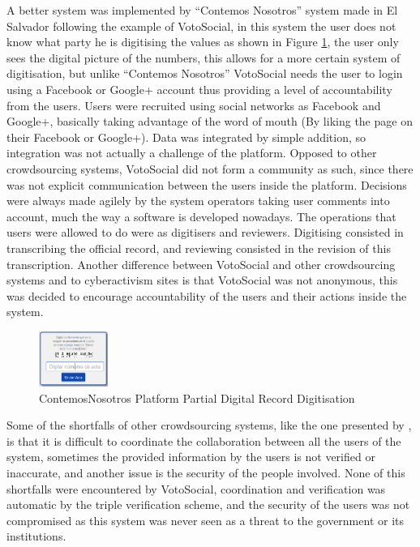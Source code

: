 \documentclass[letterpaper,10pt]{article}
\begin{document}
A better system was implemented by ``Contemos Nosotros'' \citep{contemosnosotros} system made in El Salvador following the example of VotoSocial, in this system the user does not know what party he is digitising the values as shown in Figure \ref{fig:salvador}, the user only sees the digital picture of the numbers, this allows for a more certain system of digitisation, but unlike ``Contemos Nosotros'' VotoSocial needs the user to login using a Facebook or Google+ account thus providing a level of accountability from the users. Users were recruited using social networks as Facebook and Google+, basically taking advantage of the word of mouth (By liking the page on their Facebook or Google+). Data was integrated by simple addition, so integration was not actually a challenge of the platform. Opposed to other crowdsourcing systems, VotoSocial did not form a community as such, since there was not explicit communication between the users inside the platform. Decisions were always made agilely by the system operators taking user comments into account, much the way a software is developed nowadays. The operations that users were allowed to do were as digitisers and reviewers. Digitising consisted in transcribing the official record, and reviewing consisted in the revision of this transcription. Another difference between VotoSocial and other crowdsourcing systems and to cyberactivism sites is that VotoSocial was not anonymous, this was decided to encourage accountability of the users and their actions inside the system. 

\begin{figure}[h!]
    \centering
    \includegraphics[width=0.2\textwidth]{images/salvador}
    \caption{ContemosNosotros Platform Partial Digital Record Digitisation}
    \label{fig:salvador}
\end{figure}


Some of the shortfalls of other crowdsourcing systems, like the one presented by \cite{gao2011}, is that it is difficult to coordinate the collaboration between all the users of the system, sometimes the provided information by the users is not verified or inaccurate, and another issue is the security of the people involved. None of this shortfalls were encountered by VotoSocial, coordination and verification was automatic by the triple verification scheme, and the security of the users was not compromised as this system was never seen as a threat to the government or its institutions.
\end{document}
